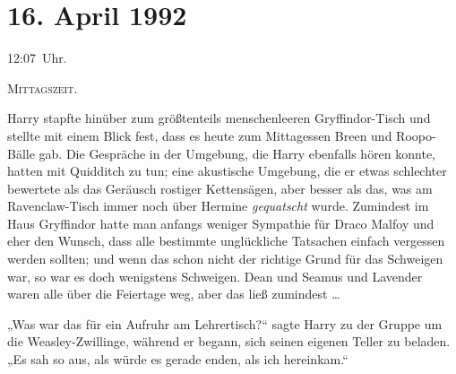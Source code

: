 
\section{16. April 1992}

12:07~Uhr.

\lettrine{M}{ittagszeit.}

\hplettrineextrapara
Harry stapfte hinüber zum größtenteils menschenleeren Gryffindor-Tisch und stellte mit einem Blick fest, dass es heute zum Mittagessen Breen und Roopo-Bälle gab. Die Gespräche in der Umgebung, die Harry ebenfalls hören konnte, hatten mit Quidditch zu tun; eine akustische Umgebung, die er etwas schlechter bewertete als das Geräusch rostiger Kettensägen, aber besser als das, was am Ravenclaw-Tisch immer noch über Hermine \emph{gequatscht} wurde. Zumindest im Haus Gryffindor hatte man anfangs weniger Sympathie für Draco Malfoy und eher den Wunsch, dass alle bestimmte unglückliche Tatsachen einfach vergessen werden sollten; und wenn das schon nicht der richtige Grund für das Schweigen war, so war es doch wenigstens Schweigen. Dean und Seamus und Lavender waren alle über die Feiertage weg, aber das ließ zumindest …

„Was war das für ein Aufruhr am Lehrertisch?“ sagte Harry zu der Gruppe um die Weasley-Zwillinge, während er begann, sich seinen eigenen Teller zu beladen.
„Es sah so aus, als würde es gerade enden, als ich hereinkam.“


